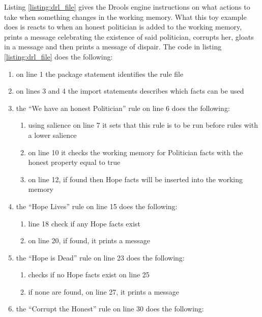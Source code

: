 Listing \ref{listing:drl_file} gives the Drools engine instructions on what actions to take when something changes in the working memory.
What this toy example does is reacts to when an honest politician is added to the working memory, prints a message celebrating the existence of said politician, corrupts her, gloats in a message and then prints a message of dispair.
The code in listing \ref{listing:drl_file} does the following: 
\begin{enumerate}[topsep=2pt,itemsep=2pt,partopsep=2pt, parsep=2pt]
    \item on line 1 the package statement identifies the rule file
    \item on lines 3 and 4 the import statements describes which facts can be used
    \item the ``We have an honest Politician'' rule on line 6 does the following:
    \begin{enumerate}[topsep=2pt,itemsep=2pt,partopsep=2pt, parsep=2pt]
        \item using salience on line 7 it sets that this rule is to be run before rules with a lower salience
        \item on line 10 it checks the working memory for Politician facts with the honest property equal to true
        \item on line 12, if found then Hope facts will be inserted into the working memory
    \end{enumerate}
    \item the ``Hope Lives'' rule on line 15 does the following:
    \begin{enumerate}[topsep=2pt,itemsep=2pt,partopsep=2pt, parsep=2pt]
        \item line 18 check if any Hope facts exist
        \item on line 20, if found, it prints a message
    \end{enumerate}
    \item the ``Hope is Dead'' rule on line 23 does the following:
    \begin{enumerate}[topsep=2pt,itemsep=2pt,partopsep=2pt, parsep=2pt]
        \item checks if no Hope facts exist on line 25
        \item if none are found, on line 27, it prints a message 
    \end{enumerate}
    \item the ``Corrupt the Honest'' rule on line 30 does the following:
    \begin{enumerate}[topsep=2pt,itemsep=2pt,partopsep=2pt, parsep=2pt]

\end{enumerate}
\end{enumerate}
